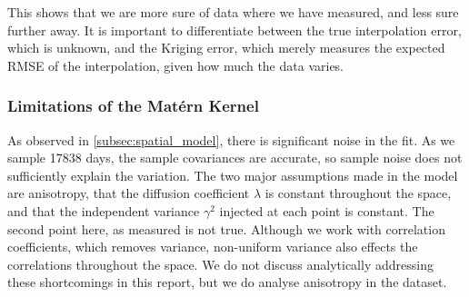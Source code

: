 \documentclass[12pt,a4paper]{article} %
\begin{document}
This shows that we are more sure of data where we have measured, and less sure further away. It is important to differentiate between the true interpolation error, which is unknown, and the Kriging error, which merely measures the expected RMSE of the interpolation, given how much the data varies.

\subsubsection{Limitations of the Mat\'{e}rn Kernel}
As observed in \ref{subsec:spatial_model}, there is significant noise in the fit. As we sample 17838 days, the sample covariances are accurate, so sample noise does not sufficiently explain the variation. The two major assumptions made in the model are anisotropy, that the diffusion coefficient $\lambda$ is constant throughout the space, and that the independent variance $\gamma^2$ injected at each point is constant. The second point here, as measured is not true. Although we work with correlation coefficients, which removes variance, non-uniform variance also effects the correlations throughout the space. We do not discuss analytically addressing these shortcomings in this report, but we do analyse anisotropy in the dataset.
\end{document}

